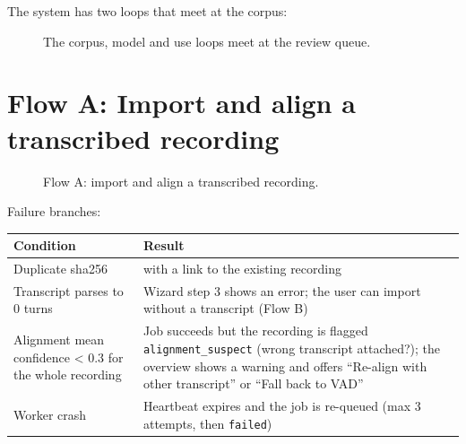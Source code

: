 \documentclass[11pt]{article}
\begin{document}
{\small\setlength{\parskip}{0pt}\setcounter{tocdepth}{1}\tableofcontents}
\bigskip
The system has two loops that meet at the corpus:

\begin{figure}[!htbp]\centering
\resizebox{\ifdim\width>\linewidth\linewidth\else\width\fi}{!}{}
\caption{The corpus, model and use loops meet at the review queue.}
\end{figure}

\hypertarget{flow-a-import-and-align-a-transcribed-recording}{%
\section{Flow A: Import and align a transcribed recording}\label{flow-a-import-and-align-a-transcribed-recording}}

\begin{figure}[!htbp]\centering
\resizebox{\ifdim\width>\linewidth\linewidth\else\width\fi}{!}{}
\caption{Flow A: import and align a transcribed recording.}
\end{figure}

Failure branches:

\begin{longtable}[]{@{}>{\raggedright\arraybackslash}p{}>{\raggedright\arraybackslash}p{}@{}}
\toprule\noalign{}
Condition & Result \\
\midrule\noalign{}
\endhead
\bottomrule\noalign{}
\endlastfoot
Duplicate sha256 & 409 with a link to the existing recording \\
Transcript parses to 0 turns & Wizard step 3 shows an error; the user can import without a transcript (Flow B) \\
Alignment mean confidence \textless{} 0.3 for the whole recording & Job succeeds but the recording is flagged \texttt{alignment\_\allowbreak{}suspect} (wrong transcript attached?); the overview shows a warning and offers ``Re-align with other transcript'' or ``Fall back to VAD'' \\
Worker crash & Heartbeat expires and the job is re-queued (max 3 attempts, then \texttt{failed}) \\
\end{longtable}
\end{document}
